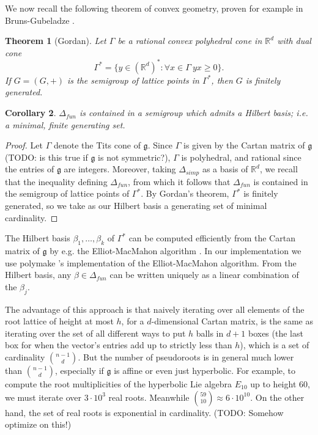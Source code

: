 \documentclass[12pt]{report}
\newcommand{\RR}{\mathbb{R}}
\newcommand{\g}{\mathfrak g}
\newcommand{\dfn}[1]{\emph{#1}\index{#1}}
\newtheorem{theorem}{Theorem}[chapter]
\newtheorem{corollary}[theorem]{Corollary}
\theoremstyle{definition}
\begin{document}
We now recall the following theorem of convex geometry, proven for example in Bruns-Gubeladze \cite{bruns2009polytopes}.
\begin{theorem}[Gordan]
	Let $\Gamma$ be a rational convex polyhedral cone in $\RR^d$ with dual cone
	$$\Gamma^* = \{y \in (\RR^d)^*: \forall x \in \Gamma ~yx \geq 0\}.$$
	If $G = (G, +)$ is the semigroup of lattice points in $\Gamma^*$, then $G$ is finitely generated.
\end{theorem}
\begin{corollary}
	$\Delta_{fun}$ is contained in a semigroup which admits a \dfn{Hilbert basis}; i.e. a minimal, finite generating set.
\end{corollary}
\begin{proof}
	Let $\Gamma$ denote the Tits cone of $\g$. Since $\Gamma$ is given by the Cartan matrix of $\g$ (TODO: is this true if $\g$ is not symmetric?), $\Gamma$ is polyhedral, and rational since the entries of $\g$ are integers. Moreover, taking $\Delta_{simp}$ as a basis of $\RR^d$, we recall that the inequality defining $\Delta_{fun}$, from which it follows that $\Delta_{fun}$ is contained in the semigroup of lattice points of $\Gamma^*$. By Gordan's theorem, $\Gamma^*$ is finitely generated, so we take as our Hilbert basis a generating set of minimal cardinality.
\end{proof}

The Hilbert basis $\beta_1, \dots, \beta_k$ of $\Gamma^*$ can be computed efficiently from the Cartan matrix of $\g$ by e.g. the Elliot-MacMahon algorithm \cite{pasechnik2001computing}. In our implementation we use polymake \cite{polymake2000}'s implementation of the Elliot-MacMahon algorithm. From the Hilbert basis, any $\beta \in \Delta_{fun}$ can be written uniquely as a linear combination of the $\beta_j$.

The advantage of this approach is that naively iterating over all elements of the root lattice of height at most $h$, for a $d$-dimensional Cartan matrix, is the same as iterating over the set of all different ways to put $h$ balls in $d + 1$ boxes (the last box for when the vector's entries add up to strictly less than $h$), which is a set of cardinality $\binom{n-1}d$. But the number of pseudoroots is in general much lower than $\binom{n-1}d$, especially if $\g$ is affine or even just hyperbolic. For example, to compute the root multiplicities of the hyperbolic Lie algebra $E_{10}$ up to height $60$, we must iterate over $3 \cdot 10^3$ real roots. Meanwhile $\binom{59}{10} \approx 6 \cdot 10^{10}$. On the other hand, the set of real roots is exponential in cardinality. (TODO: Somehow optimize on this!)
\end{document}
